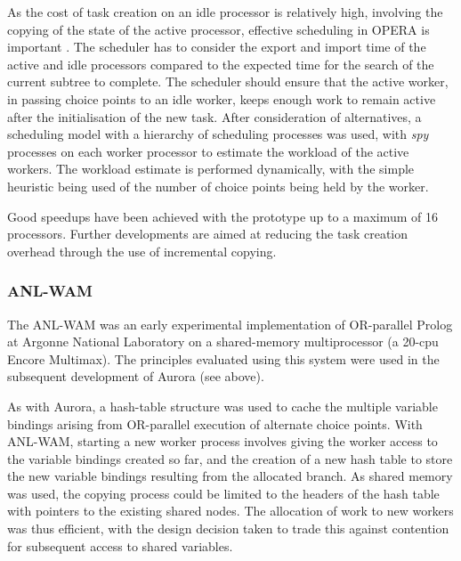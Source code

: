 As the cost of task creation on an idle processor is relatively high, involving the copying
of the state of the active processor, effective
scheduling in OPERA is important \cite{B+92}.
The scheduler has to consider the export and import time of the active and idle processors compared
to the expected time for the search of the current subtree to complete.  The scheduler should
ensure that the active worker, in passing choice points to an idle worker, keeps enough work
to remain active after the initialisation of the new task.  After consideration of alternatives,
a scheduling model with a hierarchy of scheduling processes was used, with \textit{spy} processes
on each worker processor to estimate the workload of the active workers.  The workload 
estimate is performed dynamically, with the simple heuristic being used of the number of
choice points being held by the worker.

Good speedups have been achieved with the prototype up to a maximum of 16 processors.
Further developments are aimed at reducing the task creation overhead through the use of
incremental copying.


\subsubsection{ANL-WAM}


The ANL-WAM was an early experimental implementation of OR-parallel Prolog 
at Argonne National Laboratory on a
shared-memory multiprocessor (a 20-cpu Encore Multimax).
The principles evaluated using this system \cite{DLO87} were used in the subsequent development
of Aurora (see above).

As with Aurora, a hash-table structure was used to cache the multiple variable bindings
arising from OR-parallel execution of alternate choice points.  With ANL-WAM,
starting a new worker process involves giving the worker access to the variable bindings
created so far, and the creation of a new hash table to store the new variable bindings
resulting from the allocated branch.  As shared memory was used, the copying process could
be limited to the headers of the hash table with pointers to the existing shared nodes.
The allocation of work to new workers was thus efficient, with the design decision taken to
trade this against contention for subsequent access to shared variables.

